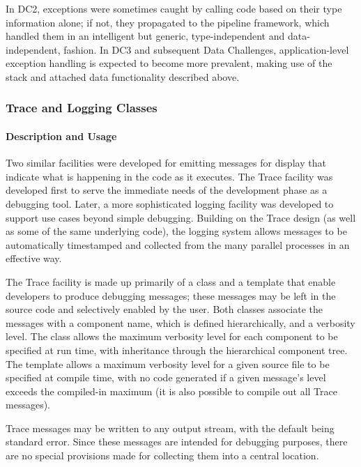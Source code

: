 In DC2, exceptions were sometimes caught by calling code based on their
type information alone; if not, they propagated to the pipeline
framework, which handled them in an intelligent but generic,
type-independent and data-independent, fashion.  In DC3 and subsequent
Data Challenges, application-level exception handling is expected to
become more prevalent, making use of the stack and attached data
functionality described above.


\subsubsection{Trace and Logging Classes}

\paragraph{Description and Usage}

Two similar facilities were developed for emitting messages for
display that indicate what is happening in the code as it executes.
The Trace facility was developed first to serve the immediate
needs of the development phase as a debugging tool.  Later, a more
sophisticated logging facility was developed to support use cases
beyond simple debugging.  Building on the Trace design (as well as
some of the same underlying code), the logging system allows messages
to be automatically timestamped and collected from the many parallel
processes in an effective way.

The Trace facility is made up primarily of a  class
and a  template that enable developers to produce debugging 
messages; these messages may be left in the source code
and selectively enabled by the user.  Both classes associate the
messages with a component name, which is defined hierarchically, and a
verbosity level.  The class allows the maximum verbosity level for each
component to be specified at run time, with inheritance through the
hierarchical component tree.  The template allows a maximum verbosity
level for a given source file to be specified at compile time, with no
code generated if a given message's level exceeds the compiled-in
maximum (it is also possible to compile out all Trace messages).

Trace messages may be written to any output stream, with the default
being standard error.  Since these messages are intended for debugging
purposes, there are no special provisions made for collecting them into
a central location.  

